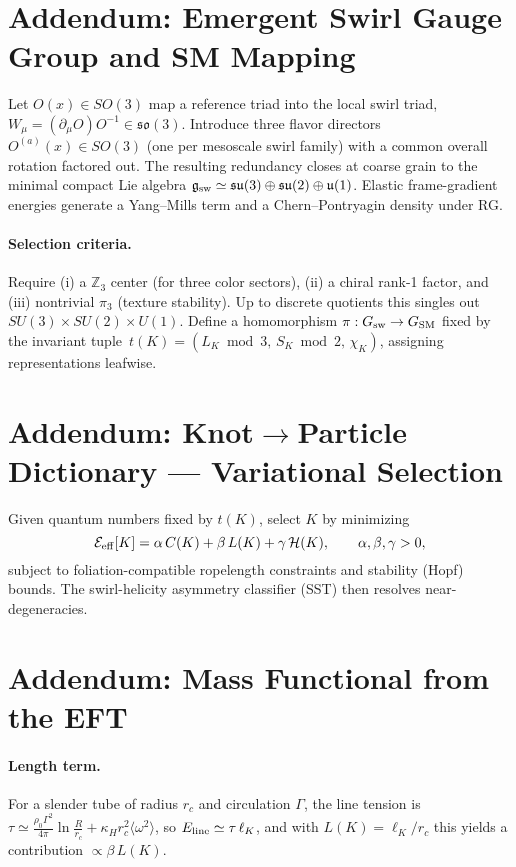 \clearpage
\section*{Addendum: Emergent Swirl Gauge Group and SM Mapping}
Let \(O(x)\in SO(3)\) map a reference triad into the local swirl triad, \(W_\mu=(\partial_\mu O)O^{-1}\in\mathfrak{so}(3)\).
Introduce three flavor directors \(O^{(a)}(x)\in SO(3)\) (one per mesoscale swirl family) with a common overall rotation factored out.
The resulting redundancy closes at coarse grain to the minimal compact Lie algebra
\(\mathfrak g_{\rm sw}\simeq \mathfrak{su}(3)\oplus\mathfrak{su}(2)\oplus\mathfrak u(1)\).
Elastic frame-gradient energies generate a Yang--Mills term and a Chern--Pontryagin density under RG.

\paragraph{Selection criteria.}
Require (i) a \(\mathbb Z_3\) center (for three color sectors), (ii) a chiral rank-1 factor, and (iii) nontrivial \(\pi_3\) (texture stability).
Up to discrete quotients this singles out \(SU(3)\times SU(2)\times U(1)\).
Define a homomorphism \(\pi:G_{\rm sw}\to G_{\rm SM}\) fixed by the invariant tuple
\(\,t(K)=(L_K\bmod 3,\,S_K\bmod 2,\,\chi_K)\), assigning representations leafwise.

\clearpage
\section*{Addendum: Knot\(\to\)Particle Dictionary --- Variational Selection}
Given quantum numbers fixed by \(t(K)\), select \(K\) by minimizing
\begin{equation}
\mathcal E_{\rm eff}[K]=\alpha\,C(K)+\beta\,L(K)+\gamma\,\mathcal H(K),\qquad \alpha,\beta,\gamma>0,
\end{equation}
subject to foliation-compatible ropelength constraints and stability (Hopf) bounds. The swirl-helicity asymmetry classifier (SST) then
resolves near-degeneracies.

\clearpage
\section*{Addendum: Mass Functional from the EFT}
\paragraph{Length term.}
For a slender tube of radius \(r_c\) and circulation \(\Gamma\), the line tension is
\(\tau\simeq \frac{\rho_0\Gamma^2}{4\pi}\ln\!\frac{R}{r_c}+\kappa_H r_c^2\langle\omega^2\rangle\), so \(E_{\rm line}\simeq \tau\,\ell_K\),
and with \(L(K)=\ell_K/r_c\) this yields a contribution \(\propto \beta\,L(K)\).

